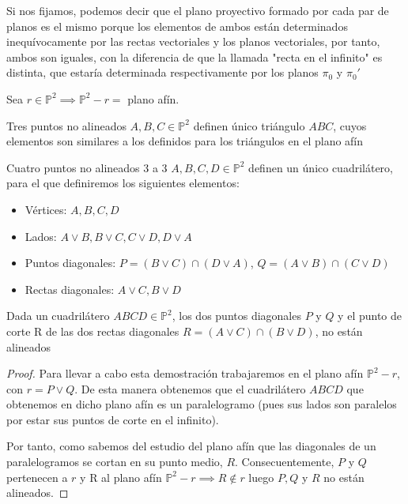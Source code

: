 Si nos fijamos, podemos decir que el plano proyectivo formado por cada par de planos es el mismo porque los elementos de ambos están determinados inequívocamente por las rectas vectoriales y los planos vectoriales, por tanto, ambos son iguales, con la diferencia de que la llamada "recta en el infinito" es distinta, que estaría determinada respectivamente por los planos $\pi_0$ y $\pi_0'$

\begin{nprop}
Sea $r \in \mathbb{P}^2 \implies \mathbb{P}^2 - r =$ plano afín.
\end{nprop}

\begin{ndef}
Tres puntos no alineados $A,B,C \in \mathbb{P}^2$ definen único triángulo $ABC$, cuyos elementos son similares a los definidos para los triángulos en el plano afín
\end{ndef}

\begin{ndef}
Cuatro puntos no alineados 3 a 3 $A,B,C,D \in \mathbb{P}^2$ definen un único cuadrilátero, para el que definiremos los siguientes elementos:
\begin{itemize}
	\item Vértices: $A, B, C, D$
	\item Lados: $A\vee B, B\vee C, C\vee D, D\vee A$
	\item Puntos diagonales: $P = (B\vee C) \cap (D\vee A)$, $Q = (A\vee B) \cap (C\vee D)$
	\item Rectas diagonales: $A\vee C, B\vee D$
\end{itemize}
\end{ndef}

\begin{nth}
	Dada un cuadrilátero $ABCD \in \mathbb{P}^2$, los dos puntos diagonales $P$ y $Q$ y el punto de corte R de las dos rectas diagonales $R = (A \vee C)\cap (B\vee D)$, no están alineados
\\


\end{nth}
\begin{proof}
	Para llevar a cabo esta demostración trabajaremos en el plano afín $\mathbb{P}^2 -r$, con $r = P\vee Q$. De esta manera obtenemos que el cuadrilátero $ABCD$ que obtenemos en dicho plano afín es un paralelogramo (pues sus lados son paralelos por estar sus puntos de corte en el infinito).

	Por tanto, como sabemos del estudio del plano afín que las diagonales de un paralelogramos se cortan en su punto medio, $R$. Consecuentemente, $P$ y $Q$ pertenecen a $r$ y R al plano afín $\mathbb{P}^2 - r \implies R \notin r$ luego $P,Q$ y $R$ no están alineados.
	\end{proof}

